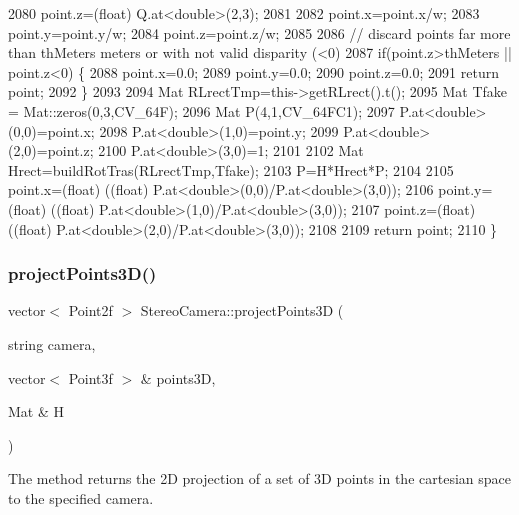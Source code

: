 \begin{DoxyCode}
2080     point.z=(float) Q.at<\textcolor{keywordtype}{double}>(2,3);
2081 
2082     point.x=point.x/w;
2083     point.y=point.y/w;
2084     point.z=point.z/w;
2085 
2086     \textcolor{comment}{// discard points far more than thMeters meters or with not valid disparity (<0)}
2087     \textcolor{keywordflow}{if}(point.z>thMeters || point.z<0) \{
2088         point.x=0.0;
2089         point.y=0.0;
2090         point.z=0.0;
2091         \textcolor{keywordflow}{return} point;
2092     \}
2093 
2094     Mat RLrectTmp=this->getRLrect().t();
2095     Mat Tfake = Mat::zeros(0,3,CV\_64F);
2096     Mat P(4,1,CV\_64FC1);
2097     P.at<\textcolor{keywordtype}{double}>(0,0)=point.x;
2098     P.at<\textcolor{keywordtype}{double}>(1,0)=point.y;
2099     P.at<\textcolor{keywordtype}{double}>(2,0)=point.z;
2100     P.at<\textcolor{keywordtype}{double}>(3,0)=1;
2101 
2102     Mat Hrect=buildRotTras(RLrectTmp,Tfake);
2103     P=H*Hrect*P;
2104 
2105     point.x=(float) ((\textcolor{keywordtype}{float}) P.at<\textcolor{keywordtype}{double}>(0,0)/P.at<\textcolor{keywordtype}{double}>(3,0));
2106     point.y=(float) ((\textcolor{keywordtype}{float}) P.at<\textcolor{keywordtype}{double}>(1,0)/P.at<\textcolor{keywordtype}{double}>(3,0));
2107     point.z=(float) ((\textcolor{keywordtype}{float}) P.at<\textcolor{keywordtype}{double}>(2,0)/P.at<\textcolor{keywordtype}{double}>(3,0));
2108 
2109     \textcolor{keywordflow}{return} point;
2110 \}
\end{DoxyCode}
\mbox{\label{classStereoCamera_a03406c9d31c1b765a8d6ef9641222309}} 
\subsubsection{\texorpdfstring{project\+Points3\+D()}{projectPoints3D()}}
{\footnotesize\ttfamily vector$<$ Point2f $>$ Stereo\+Camera\+::project\+Points3D (\begin{DoxyParamCaption}\item[{string}]{camera,  }\item[{vector$<$ Point3f $>$ \&}]{points3D,  }\item[{Mat \&}]{H }\end{DoxyParamCaption})}



The method returns the 2D projection of a set of 3D points in the cartesian space to the specified camera. 


